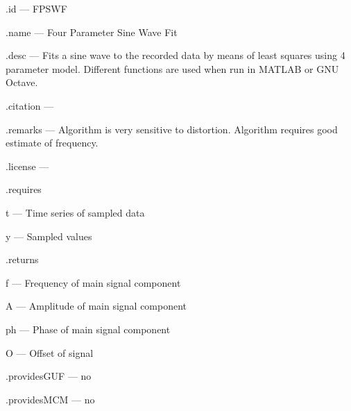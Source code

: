 \begin{tightdesc}
\item [\textsf{.id}] --- FPSWF
\item [\textsf{.name}] --- Four Parameter Sine Wave Fit
\item [\textsf{.desc}] --- Fits a sine wave to the recorded data by means of least squares using 4 parameter model. Different functions are used when run in MATLAB or GNU Octave.
\item [\textsf{.citation}] --- 
\item [\textsf{.remarks}] --- Algorithm is very sensitive to distortion. Algorithm requires good estimate of frequency.
\item [\textsf{.license}] --- 
\item [\textsf{.requires}] \rule{0em}{0em}
\begin{tightdesc}
\item [\textsf{t}] --- Time series of sampled data
\item [\textsf{y}] --- Sampled values
\end{tightdesc}
\item [\textsf{.returns}] \rule{0em}{0em}
\begin{tightdesc}
\item [\textsf{f}] --- Frequency of main signal component
\item [\textsf{A}] --- Amplitude of main signal component
\item [\textsf{ph}] --- Phase of main signal component
\item [\textsf{O}] --- Offset of signal
\end{tightdesc}
\item [\textsf{.providesGUF}] --- no
\item [\textsf{.providesMCM}] ---  no
\end{tightdesc}
